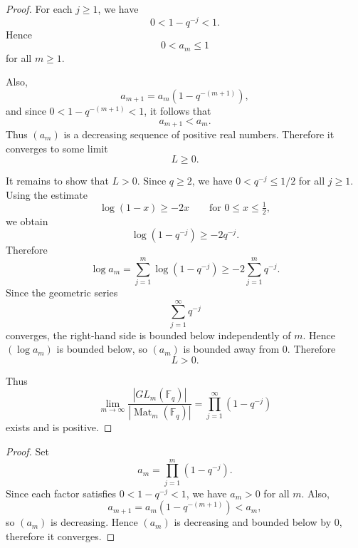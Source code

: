 \documentclass[11pt]{article}
\newcommand{\F}{\mathbb{F}}
\newcommand{\Mat}{\operatorname{Mat}}
\theoremstyle{definition}
\theoremstyle{plain}
\begin{document}
\begin{proof}
	For each \(j\ge 1\), we have
	\[
	0<1-q^{-j}<1.
	\]
	Hence
	\[
	0<a_m\le 1
	\]
	for all \(m\ge 1\).
	
	Also,
	\[
	a_{m+1}=a_m(1-q^{-(m+1)}),
	\]
	and since \(0<1-q^{-(m+1)}<1\), it follows that
	\[
	a_{m+1}<a_m.
	\]
	Thus \((a_m)\) is a decreasing sequence of positive real numbers. Therefore it converges to some limit
	\[
	L\ge 0.
	\]
	
	It remains to show that \(L>0\). Since \(q\ge 2\), we have \(0<q^{-j}\le 1/2\) for all \(j\ge 1\). Using the estimate
	\[
	\log(1-x)\ge -2x
	\qquad\text{for } 0\le x\le \tfrac12,
	\]
	we obtain
	\[
	\log(1-q^{-j})\ge -2q^{-j}.
	\]
	Therefore
	\[
	\log a_m
	=
	\sum_{j=1}^{m}\log(1-q^{-j})
	\ge
	-2\sum_{j=1}^{m} q^{-j}.
	\]
	Since the geometric series
	\[
	\sum_{j=1}^{\infty} q^{-j}
	\]
	converges, the right-hand side is bounded below independently of \(m\). Hence \((\log a_m)\) is bounded below, so \((a_m)\) is bounded away from \(0\). Therefore
	\[
	L>0.
	\]
	
	Thus
	\[
	\lim_{m\to\infty}\frac{|GL_m(\F_q)|}{|\Mat_m(\F_q)|}
	=
	\prod_{j=1}^{\infty}(1-q^{-j})
	\]
	exists and is positive.
\end{proof}

\begin{proof}
	Set
	\[
	a_m=\prod_{j=1}^{m}(1-q^{-j}).
	\]
	Since each factor satisfies \(0<1-q^{-j}<1\), we have \(a_m>0\) for all \(m\). Also,
	\[
	a_{m+1}=a_m(1-q^{-(m+1)})<a_m,
	\]
	so \((a_m)\) is decreasing. Hence \((a_m)\) is decreasing and bounded below by \(0\), therefore it converges.
\end{proof}
	
\end{document}
